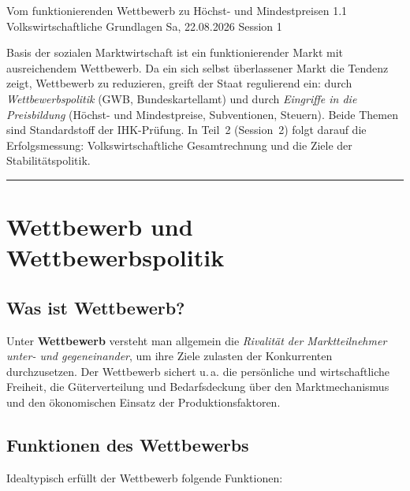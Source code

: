 \documentclass[11pt, a4paper]{article}
\begin{document}
%
  {Vom funktionierenden Wettbewerb zu Höchst- und Mindestpreisen}%
  {1.1 Volkswirtschaftliche Grundlagen}%
  {Sa, 22.08.2026 \textperiodcentered{} Session 1}

\begin{merksatz}[title={\bfseries Worum geht es in Teil 1?}]
Basis der sozialen Marktwirtschaft ist ein funktionierender Markt mit ausreichendem
Wettbewerb. Da ein sich selbst überlassener Markt die Tendenz zeigt, Wettbewerb zu
reduzieren, greift der Staat regulierend ein: durch \emph{Wettbewerbspolitik} (GWB,
Bundeskartellamt) und durch \emph{Eingriffe in die Preisbildung} (Höchst- und
Mindestpreise, Subventionen, Steuern). Beide Themen sind Standardstoff der IHK-Prüfung.
In Teil~2 (Session~2) folgt darauf die Erfolgsmessung: Volkswirtschaftliche
Gesamtrechnung und die Ziele der Stabilitätspolitik.
\end{merksatz}

\tableofcontents
\vspace{1em}
\hrule
\vspace{1em}

\section{Wettbewerb und Wettbewerbspolitik}

\subsection{Was ist Wettbewerb?}

Unter \textbf{Wettbewerb} versteht man allgemein die \emph{Rivalität der Marktteilnehmer
unter- und gegeneinander}, um ihre Ziele zulasten der Konkurrenten durchzusetzen. Der
Wettbewerb sichert u.\,a. die persönliche und wirtschaftliche Freiheit, die
Güterverteilung und Bedarfsdeckung über den Marktmechanismus und den ökonomischen
Einsatz der Produktionsfaktoren.

\subsection{Funktionen des Wettbewerbs}

Idealtypisch erfüllt der Wettbewerb folgende Funktionen:
\end{document}
